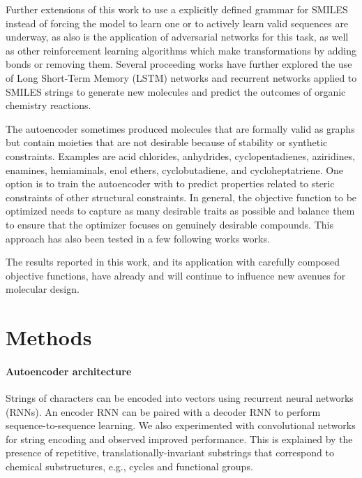 Further extensions of this work to use a explicitly defined grammar for SMILES instead of forcing the model to learn one\cite{kusner2017grammar} or to actively learn valid sequences\cite{Janz2017,jaques2017sequence} are underway, as also is the application of adversarial networks for this task,\cite{guimaraes2017objective, Sanchez-Lengeling2017,blaschke2017application} as well as other reinforcement learning algorithms which make transformations by adding bonds or removing them.\cite{Zhou2018Optimization} 
Several proceeding works have further explored the use of Long Short-Term Memory (LSTM) networks and recurrent networks applied to SMILES strings to generate new molecules\cite{yang2017chemts,segler2017generating} and predict the outcomes of organic chemistry reactions.\cite{liu2017retrosynthetic}

The autoencoder sometimes produced molecules that are formally valid as graphs but contain moieties that are not desirable because of stability or synthetic constraints.  Examples are acid chlorides, anhydrides, cyclopentadienes, aziridines, enamines, hemiaminals, enol ethers, cyclobutadiene, and cycloheptatriene. One option is to train the autoencoder with to predict properties related to steric constraints of other structural constraints. In general, the objective function to be optimized needs to capture as many desirable traits as possible and balance them to ensure that the optimizer focuses on genuinely desirable compounds. This approach has also been tested in a few following works works.\cite{Janz2017,jaques2017sequence} 

The results reported in this work, and its application with carefully composed objective functions, have already and will continue to influence new avenues for molecular design.

\section*{Methods}

\paragraph{Autoencoder architecture}
Strings of characters can be encoded into vectors using recurrent neural networks (RNNs). 
An encoder RNN can be paired with a decoder RNN to perform sequence-to-sequence learning.\cite{sutskever2014sequence}
We also experimented with convolutional networks for string encoding\cite{KalchbrennerACL2014} and observed improved performance.
This is explained by the presence of repetitive, translationally-invariant substrings that correspond to chemical substructures, e.g., cycles and functional groups.

